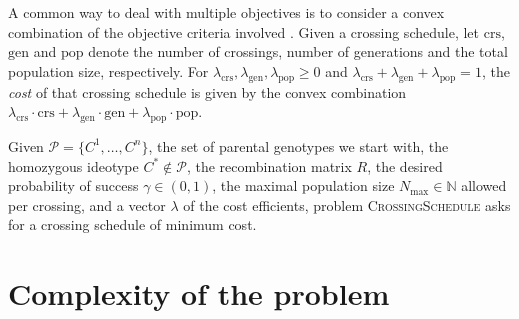 \documentclass[runningheads]{llncs}
\begin{document}
A common way to deal with multiple objectives is to consider a convex combination of the objective criteria involved \cite{Steuer:1986}. Given a crossing schedule, let $\mathrm{crs}$, $\mathrm{gen}$ and $\mathrm{pop}$ denote the number of crossings, number of generations and the total population size, respectively. For $\lambda_\mathrm{crs},\lambda_\mathrm{gen},\lambda_\mathrm{pop} \geq 0$ and $\lambda_\mathrm{crs}+\lambda_\mathrm{gen}+\lambda_\mathrm{pop} = 1$, the \emph{cost} of that crossing schedule is given by the convex combination
$  \lambda_\mathrm{crs} \cdot \mathrm{crs} + \lambda_\mathrm{gen} \cdot \mathrm{gen} + \lambda_\mathrm{pop} \cdot \mathrm{pop} $.
\begin{problem}
Given $\mathcal{P} = \{C^1,\ldots,C^n\}$, the set of parental genotypes we start with, the homozygous ideotype $C^* \not \in \mathcal{P}$, the recombination matrix $R$, the desired probability of success $\gamma \in (0,1)$, the maximal population size $N_\mathrm{max}\in \mathbb{N}$  allowed per crossing, and a vector $\lambda$ of the cost efficients, problem \textsc{CrossingSchedule} asks for a crossing schedule of minimum cost.%
\end{problem}

\section{Complexity of the problem}
\label{sec:complexity}
\end{document}
